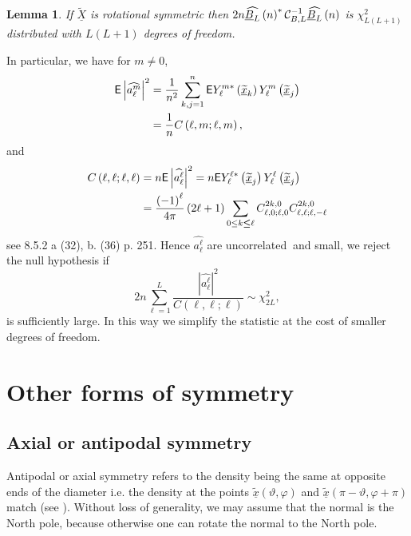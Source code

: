 \documentclass[preprint,11pt,a4paper]{elsarticle}
\newtheorem{lemma}[theorem]{Lemma}
\begin{document}
\begin{lemma}
If $\underline{\widetilde{X}}$ is rotational symmetric then $2n\widehat{%
\underline{B}_{L}}\left( n\right) ^{\ast}\mathcal{C}_{B,L}^{-1}\widehat{%
\underline{B}_{L}}\left( n\right) $ is $\chi_{L\left( L+1\right) }^{2}$
distributed with $L\left( L+1\right) $ degrees of freedom.
\end{lemma}

In particular, we have for $m\neq0$, 
\begin{align*}
\mathsf{E}\left\vert \widehat{a_{\ell}^{m}}\right\vert ^{2} & =\frac {1}{%
n^{2}}\sum_{k,j=1}^{n}\mathsf{E}Y_{\ell}^{m\ast}\left( \underline{\widetilde{%
x}}_{k}\right) Y_{\ell}^{m}\left( \underline{\widetilde{x}}_{j}\right) \\
& =\frac{1}{n}C\left( \ell,m;\ell,m\right) ,
\end{align*}
and 
\begin{align*}
C\left( \ell,\ell;\ell,\ell\right) & =n\mathsf{E}\left\vert \widehat{%
a_{\ell}^{\ell}}\right\vert ^{2}=n\mathsf{E}Y_{\ell}^{\ell\ast }\left( 
\underline{\widetilde{x}}_{j}\right) Y_{\ell}^{\ell}\left( \underline{%
\widetilde{x}}_{j}\right) \\
& =\frac{\left( -1\right) ^{\ell}}{4\pi}\left( 2\ell+1\right) \sum_{0\leq k%
\boldsymbol{\leq}\ell}C_{\ell,0;\ell,0}^{2k,0}C_{\ell,\ell;\ell,-\ell}^{2k,0}
\end{align*}
see 8.5.2 a (32), b. (36) p. 251. Hence $\widehat{a_{\ell}^{\ell}}$ are
uncorrelated $\ $and small, we reject the null hypothesis if 
\begin{equation*}
2n\sum_{\ell=1}^{L}\frac{\left\vert \widehat{a_{\ell}^{\ell}}\right\vert ^{2}%
}{C\left( \ell,\ell;\ell\right) }\sim\chi_{2L}^{2},
\end{equation*}
is sufficiently large. In this way we simplify the statistic at the cost of
smaller degrees of freedom.

\section{Other forms of symmetry}

\subsection{Axial or antipodal symmetry}

Antipodal or axial symmetry refers to the density being the same at opposite
ends of the diameter i.e. the density at the points $\underline{\widetilde{x}%
}\left( \vartheta,\varphi\right) $ and $\underline{\widetilde{x}}\left(
\pi-\vartheta,\varphi+\pi\right) $ match (see \cite{bingham1974antipodally}%
). Without loss of generality, we may assume that the normal is the North
pole, because otherwise one can rotate the normal to the North pole.
\end{document}
